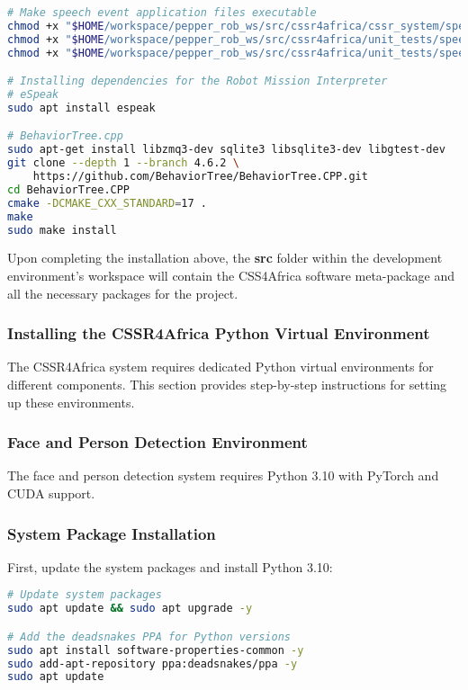 \documentclass{CSSRforAfrica}
\begin{document}
{\begin{lstlisting}[style=withoutNumbering, language=bash]
# Make speech event application files executable
chmod +x "$HOME/workspace/pepper_rob_ws/src/cssr4africa/cssr_system/speech_event/src/speech_event_application.py"
chmod +x "$HOME/workspace/pepper_rob_ws/src/cssr4africa/unit_tests/speech_event_test/src/speech_event_test_application.py"
chmod +x "$HOME/workspace/pepper_rob_ws/src/cssr4africa/unit_tests/speech_event_test/src/speech_event_driver.py"

# Installing dependencies for the Robot Mission Interpreter
# eSpeak
sudo apt install espeak

# BehaviorTree.cpp
sudo apt-get install libzmq3-dev sqlite3 libsqlite3-dev libgtest-dev
git clone --depth 1 --branch 4.6.2 \
    https://github.com/BehaviorTree/BehaviorTree.CPP.git
cd BehaviorTree.CPP
cmake -DCMAKE_CXX_STANDARD=17 .
make
sudo make install

\end{lstlisting}

\noindent Upon completing the installation above, the \textbf{src} folder within the development environment's workspace will contain the CSS4Africa software meta-package and all the necessary packages for the project. 

\subsubsection{Installing the CSSR4Africa Python Virtual Environment}
The CSSR4Africa system requires dedicated Python virtual environments for different components. This section provides step-by-step instructions for setting up these environments.


\subsubsection*{Face and Person Detection Environment}
The face and person detection system requires Python 3.10 with PyTorch and CUDA support.

\subsubsection*{System Package Installation}
First, update the system packages and install Python 3.10:
\begin{lstlisting}[style=withoutNumbering, language=bash]
# Update system packages
sudo apt update && sudo apt upgrade -y

# Add the deadsnakes PPA for Python versions
sudo apt install software-properties-common -y
sudo add-apt-repository ppa:deadsnakes/ppa -y
sudo apt update


\end{lstlisting}}
\end{document}
